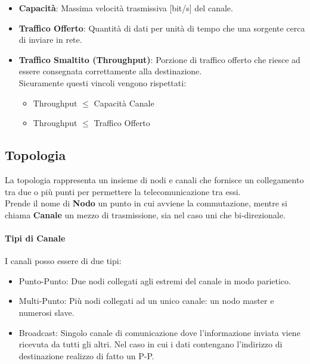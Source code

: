 \documentclass[12pt]{article}
\begin{document}
\begin{itemize}
  \item \textbf{Capacità}: Massima velocità trasmissiva [bit/s] del canale.\\
  \item \textbf{Traffico Offerto}: Quantità di dati per unità di tempo che una sorgente cerca di inviare in rete.\\
  \item \textbf{Traffico Smaltito (Throughput)}: Porzione di traffico offerto che riesce ad essere consegnata correttamente alla destinazione.\\
  Sicuramente questi vincoli vengono rispettati:
  \begin{itemize}
    \item Throughput $\leq$ Capacità Canale
    \item Throughput $\leq$ Traffico Offerto
  \end{itemize}
\end{itemize}

\subsection{Topologia}
La topologia rappresenta un insieme di nodi e canali che fornisce un collegamento tra due o più punti per permettere la telecomunicazione tra essi.\\
Prende il nome di \textbf{Nodo} un punto in cui avviene la commutazione, mentre si chiama \textbf{Canale} un mezzo di trasmissione, sia nel caso uni che bi-direzionale.

\paragraph{Tipi di Canale} I canali posso essere di due tipi:
\begin{itemize}
  \item Punto-Punto: Due nodi collegati agli estremi del canale in modo parietico.
  \item Multi-Punto: Più nodi collegati ad un unico canale: un nodo master e numerosi slave.
  \item Broadcast: Singolo canale di comunicazione dove l'informazione inviata viene ricevuta da tutti gli altri. Nel caso in cui i dati contengano l'indirizzo di destinazione realizzo di fatto un P-P.
\end{itemize}
\end{document}
